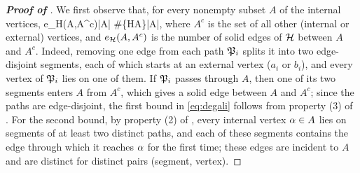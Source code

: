 \begin{proof}[\bf Proof of ]
We first observe that, for every nonempty subset $A$ of the internal vertices,
\be\label{eq:degali}
e_{\cal H}(A,A^c)\ge |A| \quad {}\quad \#\{\cal HA\}|A|,
\ee
where $A^c$ is the set of all other (internal or external) vertices, and $e_{\cal H}(A,A^c)$ is the number of solid edges of $\cal H$ between $A$ and $A^c$. Indeed, removing one edge from each path $\fP_i$ splits it into two edge-disjoint segments, each of which starts at an external vertex ($a_i$ or $b_i$), and every vertex of $\fP_i$ lies on one of them. If $\fP_i$ passes through $A$, then one of its two segments enters $A$ from $A^c$, which gives a solid edge between $A$ and $A^c$; since the paths are edge-disjoint, the first bound in \eqref{eq:degali} follows from property (3) of . For the second bound, by property (2) of , every internal vertex $\al\in A$ lies on segments of at least two distinct paths, and each of these segments contains the edge through which it reaches $\al$ for the first time; these edges are incident to $A$ and are distinct for distinct pairs (segment, vertex).


\end{proof}
